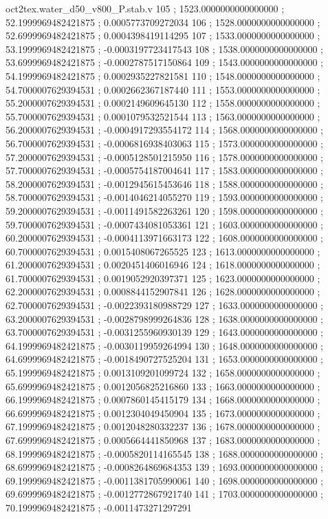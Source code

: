 \begin{filecontents}[overwrite]{oct2tex.water_d50_v800_P.stab.v}
105 ; 1523.0000000000000000 ; 52.1999969482421875 ; 0.0005773709272034
106 ; 1528.0000000000000000 ; 52.6999969482421875 ; 0.0004398419114295
107 ; 1533.0000000000000000 ; 53.1999969482421875 ; -0.0003197723417543
108 ; 1538.0000000000000000 ; 53.6999969482421875 ; -0.0002787517150864
109 ; 1543.0000000000000000 ; 54.1999969482421875 ; 0.0002935227821581
110 ; 1548.0000000000000000 ; 54.7000007629394531 ; 0.0002662367187440
111 ; 1553.0000000000000000 ; 55.2000007629394531 ; 0.0002149609645130
112 ; 1558.0000000000000000 ; 55.7000007629394531 ; 0.0001079532521544
113 ; 1563.0000000000000000 ; 56.2000007629394531 ; -0.0004917293554172
114 ; 1568.0000000000000000 ; 56.7000007629394531 ; -0.0006816938403063
115 ; 1573.0000000000000000 ; 57.2000007629394531 ; -0.0005128501215950
116 ; 1578.0000000000000000 ; 57.7000007629394531 ; -0.0005754187004641
117 ; 1583.0000000000000000 ; 58.2000007629394531 ; -0.0012945615453646
118 ; 1588.0000000000000000 ; 58.7000007629394531 ; -0.0014046214055270
119 ; 1593.0000000000000000 ; 59.2000007629394531 ; -0.0011491582263261
120 ; 1598.0000000000000000 ; 59.7000007629394531 ; -0.0007434081053361
121 ; 1603.0000000000000000 ; 60.2000007629394531 ; -0.0004113971663173
122 ; 1608.0000000000000000 ; 60.7000007629394531 ; 0.0015408067265525
123 ; 1613.0000000000000000 ; 61.2000007629394531 ; 0.0020451406016946
124 ; 1618.0000000000000000 ; 61.7000007629394531 ; 0.0019052920397371
125 ; 1623.0000000000000000 ; 62.2000007629394531 ; 0.0008844152907841
126 ; 1628.0000000000000000 ; 62.7000007629394531 ; -0.0022393180988729
127 ; 1633.0000000000000000 ; 63.2000007629394531 ; -0.0028798999264836
128 ; 1638.0000000000000000 ; 63.7000007629394531 ; -0.0031255960930139
129 ; 1643.0000000000000000 ; 64.1999969482421875 ; -0.0030119959264994
130 ; 1648.0000000000000000 ; 64.6999969482421875 ; -0.0018490727525204
131 ; 1653.0000000000000000 ; 65.1999969482421875 ; 0.0013109201099724
132 ; 1658.0000000000000000 ; 65.6999969482421875 ; 0.0012056825216860
133 ; 1663.0000000000000000 ; 66.1999969482421875 ; 0.0007860145415179
134 ; 1668.0000000000000000 ; 66.6999969482421875 ; 0.0012304049450904
135 ; 1673.0000000000000000 ; 67.1999969482421875 ; 0.0012048280332237
136 ; 1678.0000000000000000 ; 67.6999969482421875 ; 0.0005664441850968
137 ; 1683.0000000000000000 ; 68.1999969482421875 ; -0.0005820114165545
138 ; 1688.0000000000000000 ; 68.6999969482421875 ; -0.0008264869684353
139 ; 1693.0000000000000000 ; 69.1999969482421875 ; -0.0011381705990061
140 ; 1698.0000000000000000 ; 69.6999969482421875 ; -0.0012772867921740
141 ; 1703.0000000000000000 ; 70.1999969482421875 ; -0.0011473271297291

\end{filecontents}
